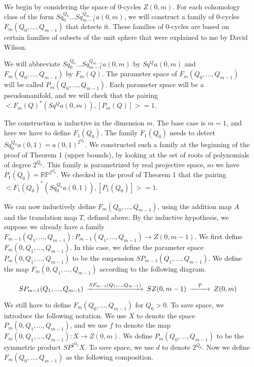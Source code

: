 \documentclass{amsart}
\newtheorem*{Theorem 1}{Theorem 1}
\newtheorem*{Theorem 2}{Theorem 2}
\newtheorem*{Theorem 1A}{Theorem 1A}
\newtheorem*{Theorem 2A}{Theorem 2A}
\newtheorem*{vanishing lemma}{Vanishing Lemma}
\numberwithin{equation}{section}
\begin{document}
\proof We begin by considering the space of 0-cycles $Z(0,m)$.  For each
cohomology class of the form $Sq_0^{Q_0} ... Sq_{m-1}^{Q_{m-1}} a(0,m)$, we will construct
a family of 0-cycles $F_m(Q_0, ..., Q_{m-1})$ that detects it.  These families of
0-cycles are based on certain families of subsets of the unit sphere that were
explained to me by David Wilson.

We will abbreviate $Sq_0^{Q_0} ... Sq_{m-1}^{Q_{m-1}} a(0,m)$ by
$Sq^Q a(0,m)$ and $F_m(Q_0, ..., Q_{m-1})$ by $F_m(Q)$.  The parameter space of
$F_m(Q_0, ..., Q_{m-1})$ will be called $P_m(Q_0, ..., Q_{m-1})$.  Each parameter space will
be a pseudomanifold, and we will check that the pairing $<F_m(Q)^*(Sq^Q a(0,m)), [P_m(Q)] > = 1$.

The construction is inductive in the dimension $m$.  The base
case is $m=1$, and here we have to define $F_1(Q_0)$.  The family
$F_1(Q_0)$ needs to detect $Sq_0^{Q_0} a(0,1) =
a(0,1)^{2^{Q_0}}$.  We constructed such a family at the beginning
of the proof of Theorem 1 (upper bounds), by looking at the set
of roots of polynomials of degree $2^{Q_0}$.  This family is
parametrized by real projective space, so we have $P_1(Q_0) =
\mathbb{RP}^{2^{Q_0}}$.  We checked in the proof of Theorem 1
that the pairing $<F_1(Q_0)^* (Sq_0^{Q_0} a(0,1)), [P_1(Q_0)] > =
1$.

We can now inductively define $F_m(Q_0, ..., Q_{m-1})$, using the
addition map $A$ and the translation map $T$, defined above.  By
the inductive hypothesis, we suppose we already have a family
$F_{m-1}(Q_1, ..., Q_{m-1}): P_{m-1}(Q_1, ..., Q_{m-1})
\rightarrow Z(0,m-1)$.  We first define $F_m(0, Q_1, ...,
Q_{m-1})$.  In this case, we define the parameter space $P_m(0,
Q_1, ..., Q_{m-1})$ to be the suspension $S P_{m-1}(Q_1, ...,
Q_{m-1})$.  We define the map $F_m(0, Q_1, ..., Q_{m-1})$
according to the following diagram.

\[
\begin{CD}
S P_{m-1}(Q_1, ..., Q_{m-1}) @>S F_{m-1}(Q_1, ..., Q_{m-1})>> S
Z(0, m-1) @>T>> Z(0,m)
\end{CD}
\]

We still have to define $F_m(Q_0, ..., Q_{m-1})$ for $Q_0 > 0$. 
To save space, we introduce the following notation.  We use $X$
to denote the space $P_m(0, Q_1, ..., Q_{m-1})$, and we use $f$
to denote the map $F_m(0, Q_1, ..., Q_{m-1}): X \rightarrow
Z(0,m)$.  We define $P_m(Q_0, ..., Q_{m-1})$ to be the symmetric
product $SP^{2^{Q_0}} X$.  To save space, we use $d$ to denote
$2^{Q_0}$.  Now we define $F_m(Q_0, ..., Q_{m-1})$ as the
following composition.
\end{document}
